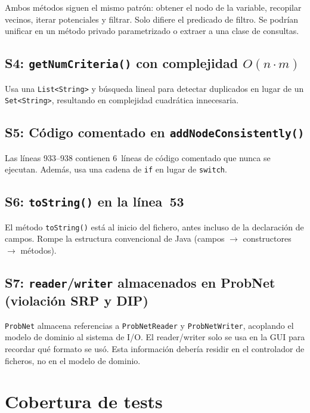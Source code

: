 \documentclass[11pt,a4paper]{article}
\newcommand{\code}[1]{\texttt{#1}}
\begin{document}
Ambos m\'etodos siguen el mismo patr\'on: obtener el nodo de la
variable, recopilar vecinos, iterar potenciales y filtrar.  Solo
difiere el predicado de filtro.  Se podr\'ian unificar en un m\'etodo
privado parametrizado o extraer a una clase de consultas.

\subsection{S4: \code{getNumCriteria()} con complejidad $O(n \cdot m)$}

Usa una \code{List<String>} y b\'usqueda lineal para detectar duplicados
en lugar de un \code{Set<String>}, resultando en complejidad
cuadr\'atica innecesaria.

\subsection{S5: C\'odigo comentado en \code{addNodeConsistently()}}

Las l\'ineas 933--938 contienen 6~l\'ineas de c\'odigo comentado que
nunca se ejecutan.  Adem\'as, usa una cadena de \code{if} en lugar de
\code{switch}.

\subsection{S6: \code{toString()} en la l\'inea~53}

El m\'etodo \code{toString()} est\'a al inicio del fichero, antes
incluso de la declaraci\'on de campos.  Rompe la estructura convencional
de Java (campos $\to$ constructores $\to$ m\'etodos).

\subsection{S7: \code{reader}/\code{writer} almacenados en ProbNet
            (violaci\'on SRP y DIP)}

\code{ProbNet} almacena referencias a \code{ProbNetReader} y
\code{ProbNetWriter}, acoplando el modelo de dominio al sistema de
I/O.  El reader/writer solo se usa en la GUI para recordar qu\'e formato
se us\'o.  Esta informaci\'on deber\'ia residir en el controlador de
ficheros, no en el modelo de dominio.

\section{Cobertura de tests}
\label{sec:tests}
\end{document}
